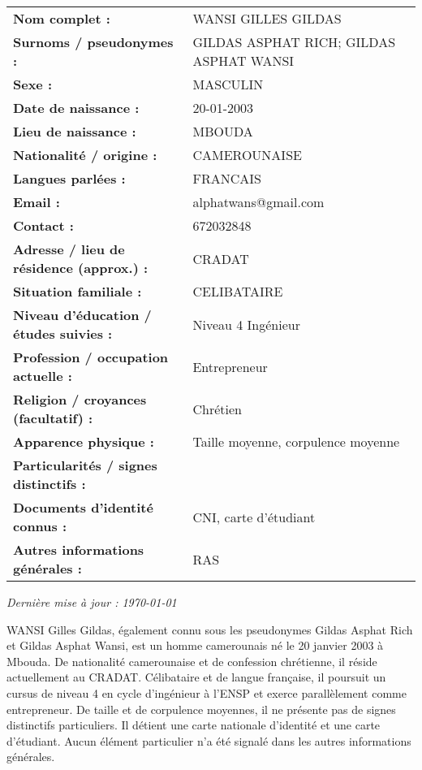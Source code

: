 \documentclass[memoire, 12pt]{report}
\begin{document}
\begin{tabular}{>{\bfseries}p{7cm}p{10cm}}
Nom complet : & WANSI GILLES GILDAS \\ 
Surnoms / pseudonymes : &  GILDAS ASPHAT RICH; GILDAS ASPHAT WANSI\\ 
Sexe : &  MASCULIN\\ 
Date de naissance : &   20-01-2003\\ 
Lieu de naissance : &  MBOUDA\\ 
Nationalité / origine : &  CAMEROUNAISE\\ 
Langues parlées : &  FRANCAIS\\ 
Email : &  alphatwans@gmail.com\\
Contact : &  672032848\\
Adresse / lieu de résidence (approx.) : & CRADAT \\ 
Situation familiale : &  CELIBATAIRE\\ 
Niveau d’éducation / études suivies : &  Niveau 4 Ingénieur \\ 
Profession / occupation actuelle : &  Entrepreneur\\ 
Religion / croyances (facultatif) : &  Chrétien\\ 
Apparence physique : & Taille moyenne, corpulence  moyenne \\ 
Particularités / signes distinctifs : &  \\ 
Documents d’identité connus : & CNI, carte d'étudiant\\ 
Autres informations générales : &  RAS\\ 
\end{tabular}

\vspace{1cm}

\begin{flushright}
    \textit{Dernière mise à jour : \today}
\end{flushright}
WANSI Gilles Gildas, également connu sous les pseudonymes Gildas Asphat Rich et Gildas Asphat Wansi, est un homme camerounais né le 20 janvier 2003 à Mbouda. De nationalité camerounaise et de confession chrétienne, il réside actuellement au CRADAT. Célibataire et de langue française, il poursuit un cursus de niveau 4 en cycle d’ingénieur à l'ENSP et exerce parallèlement comme entrepreneur. De taille et de corpulence moyennes, il ne présente pas de signes distinctifs particuliers. Il détient une carte nationale d’identité et une carte d’étudiant. Aucun élément particulier n’a été signalé dans les autres informations générales.
\end{document}
